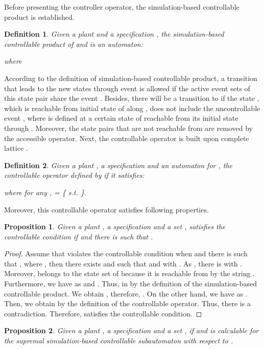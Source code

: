 \documentclass[12pt,draftcls,onecolumn]{IEEEtran}
\newtheorem{Proposition}{Proposition}
\newtheorem{Definition}{Definition}
\begin{document}
Before presenting the controller operator, the simulation-based
controllable product is established.
\begin{Definition}
Given a plant  and a specification
, the simulation-based
controllable product of  and  is an automaton:

where

\end{Definition}
According to the definition of simulation-based controllable
product, a transition that leads to the new states through event
 is allowed if the active event sets of this state pair
 share the event . Besides, there will be a
transition to  if the state ,  which is
reachable from initial state  of  along , does not
include the uncontrollable event , where  is
defined at a certain state of  reachable from its initial state
 through . Moreover, the state pairs that are not
reachable from  are removed by the accessible
operator. Next, the controllable operator is built upon complete
lattice .
\begin{Definition}
Given a plant , a specification  and an automaton  for
, the controllable operator  defined by 
if it satisfies:

where for any ,  =
\{ s.t.  \}.
\end{Definition}

Moreover, this controllable operator satisfies following properties.






\begin{Proposition} \label{cs}
Given a plant , a specification   and a set ,
 satisfies the controllable condition if 
and there is  such that .
\end{Proposition}


\begin{proof}
Assume that  violates the controllable condition when  and there is  such that ,
where , then there exists  and
 such that  and  with . As , there is  with . Moreover,  belongs to the state
set of  because it is reachable from  by the string . Furthermore, we have  as  and . Thus,  in  by
the definition of the simulation-based controllable product. We
obtain , therefore, . On
the other hand, we have  as . Then, we obtain  by the
definition of the controllable operator. Thus, there is a
contradiction. Therefore,  satisfies the controllable
condition.
\end{proof}


\begin{Proposition}\label{cm}
Given a plant , a specification  and a set ,
 if  and  is calculable
for the supremal simulation-based controllable subautomaton with
respect to .
\end{Proposition}
\end{document}
